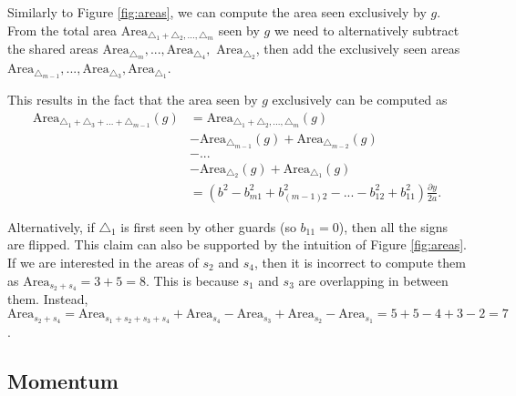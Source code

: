 Similarly to Figure \ref{fig:areas}, we can compute the area seen exclusively by $g$. From the total area $\text{Area}_{\triangle_1 + \triangle_2, ..., \triangle_m}$ seen by $g$ we need to alternatively subtract the shared areas $\text{Area}_{\triangle_m}, ..., \text{Area}_{\triangle_4},$ $\text{Area}_{\triangle_2}$, then add the exclusively seen areas $\text{Area}_{\triangle_{m - 1}}, ..., \text{Area}_{\triangle_3}, \text{Area}_{\triangle_1}$.


This results in the fact that the area seen by $g$ exclusively can be computed as 
\begin{align*}
    \text{Area}_{\triangle_1 + \triangle_3 + ... + \triangle_{m - 1}}(g) &= \text{Area}_{\triangle_1 + \triangle_2, ..., \triangle_m}(g) \\
    &- \text{Area}_{\triangle_{m - 1}}(g) + \text{Area}_{\triangle_{m - 2}}(g) \\
    &- ... \\
    &- \text{Area}_{\triangle_2}(g) + \text{Area}_{\triangle_1}(g) \\
                                                                      &= \left(b^2 - b_{m1}^2 + b_{(m - 1)2}^2 - ... - b_{12}^2 + b_{11}^2\right)\frac{\partial y}{2a}.
\end{align*}

Alternatively, if $\triangle_1$ is first seen by other guards (so $b_{11} = 0$), then all the signs are flipped. This claim can also be supported by the intuition of Figure \ref{fig:areas}. If we are interested in the areas of $s_2$ and $s_4$, then it is incorrect to compute them as $\text{Area}_{s_2 + s_4} = 3 + 5 = 8$. This is because $s_1$ and $s_3$ are overlapping in between them.  Instead, $\text{Area}_{s_2 + s_4} = \text{Area}_{s_1 + s_2 + s_3 + s_4} + \text{Area}_{s_4} - \text{Area}_{s_3} + \text{Area}_{s_2} - \text{Area}_{s_1} = 5 + 5 - 4 + 3 - 2 = 7$.

\subsection{Momentum}
\label{sec:momentum}

